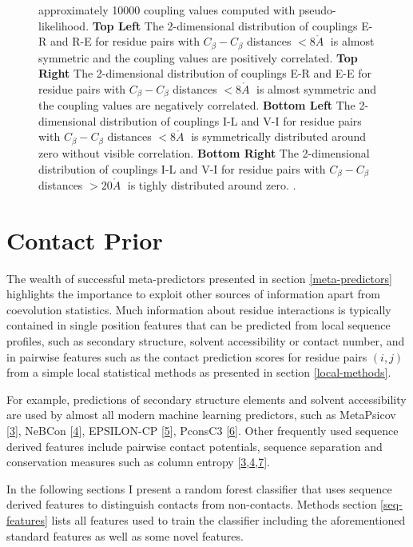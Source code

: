 \documentclass[12pt,a4paper,twoside]{book}
\newcommand{\Cb}{C_\beta}
\newcommand{\angstrom}{\mathring{A} \;}
\theoremstyle{definition}
\theoremstyle{definition}
\theoremstyle{remark}
\begin{document}
\begin{figure}
{approximately 10000 coupling values computed with pseudo-likelihood.
\textbf{Top Left} The 2-dimensional distribution of couplings E-R and
R-E for residue pairs with \(\Cb-\Cb\) distances \(< 8 \angstrom\) is
almost symmetric and the coupling values are positively correlated.
\textbf{Top Right} The 2-dimensional distribution of couplings E-R and
E-E for residue pairs with \(\Cb-\Cb\) distances \(< 8 \angstrom\) is
almost symmetric and the coupling values are negatively correlated.
\textbf{Bottom Left} The 2-dimensional distribution of couplings I-L and
V-I for residue pairs with \(\Cb-\Cb\) distances \(< 8 \angstrom\) is
symmetrically distributed around zero without visible correlation.
\textbf{Bottom Right} The 2-dimensional distribution of couplings I-L
and V-I for residue pairs with \(\Cb-\Cb\) distances \(> 20 \angstrom\)
is tighly distributed around zero. .}\label{fig:2d-coupling-profiles-0-8}
\end{figure}

\chapter{Contact Prior}\label{contact-prior}

The wealth of successful meta-predictors presented in section
\ref{meta-predictors} highlights the importance to exploit other sources
of information apart from coevolution statistics. Much information about
residue interactions is typically contained in single position features
that can be predicted from local sequence profiles, such as secondary
structure, solvent accessibility or contact number, and in pairwise
features such as the contact prediction scores for residue pairs
\((i,j)\) from a simple local statistical methods as presented in
section \ref{local-methods}.

For example, predictions of secondary structure elements and solvent
accessibility are used by almost all modern machine learning predictors,
such as MetaPsicov {[}\protect\hyperlink{ref-Jones2015a}{3}{]}, NeBCon
{[}\protect\hyperlink{ref-He2017}{4}{]}, EPSILON-CP
{[}\protect\hyperlink{ref-Stahl2017}{5}{]}, PconsC3
{[}\protect\hyperlink{ref-Skwark2016}{6}{]}. Other frequently used
sequence derived features include pairwise contact potentials, sequence
separation and conservation measures such as column entropy
{[}\protect\hyperlink{ref-Jones2015a}{3},\protect\hyperlink{ref-He2017}{4},\protect\hyperlink{ref-Ma2015a}{7}{]}.

In the following sections I present a random forest classifier that uses
sequence derived features to distinguish contacts from non-contacts.
Methods section \ref{seq-features} lists all features used to train the
classifier including the aforementioned standard features as well as
some novel features.
\end{document}
